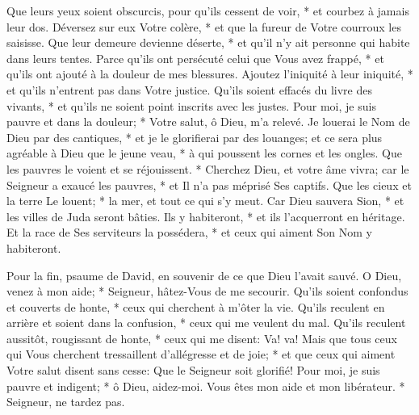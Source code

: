Que leurs yeux soient obscurcis, pour qu'ils cessent de voir, * et courbez à jamais leur dos.
Déversez sur eux Votre colère, * et que la fureur de Votre courroux les saisisse.
Que leur demeure devienne déserte, * et qu'il n'y ait personne qui habite dans leurs tentes.
Parce qu'ils ont persécuté celui que Vous avez frappé, * et qu'ils ont ajouté à la douleur de mes blessures.
Ajoutez l'iniquité à leur iniquité, * et qu'ils n'entrent pas dans Votre justice.
Qu'ils soient effacés du livre des vivants, * et qu'ils ne soient point inscrits avec les justes.
Pour moi, je suis pauvre et dans la douleur; * Votre salut, ô Dieu, m'a relevé.
Je louerai le Nom de Dieu par des cantiques, * et je le glorifierai par des louanges;
et ce sera plus agréable à Dieu que le jeune veau, * à qui poussent les cornes et les ongles.
Que les pauvres le voient et se réjouissent. * Cherchez Dieu, et votre âme vivra;
car le Seigneur a exaucé les pauvres, * et Il n'a pas méprisé Ses captifs.
Que les cieux et la terre Le louent; * la mer, et tout ce qui s'y meut.
Car Dieu sauvera Sion, * et les villes de Juda seront bâties. Ils y habiteront, * et ils l'acquerront en héritage.
Et la race de Ses serviteurs la possédera, * et ceux qui aiment Son Nom y habiteront.

Pour la fin, psaume de David, en souvenir de ce que Dieu l'avait sauvé.
O Dieu, venez à mon aide; * Seigneur, hâtez-Vous de me secourir.
Qu'ils soient confondus et couverts de honte, * ceux qui cherchent à m'ôter la vie.
Qu'ils reculent en arrière et soient dans la confusion, * ceux qui me veulent du mal. Qu'ils reculent aussitôt, rougissant de honte, * ceux qui me disent: Va! va!
Mais que tous ceux qui Vous cherchent tressaillent d'allégresse et de joie; * et que ceux qui aiment Votre salut disent sans cesse: Que le Seigneur soit glorifié!
Pour moi, je suis pauvre et indigent; * ô Dieu, aidez-moi. Vous êtes mon aide et mon libérateur. * Seigneur, ne tardez pas.

